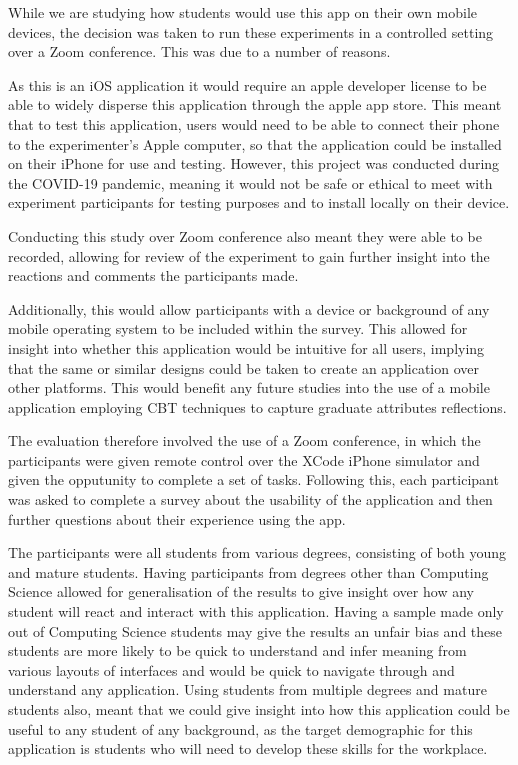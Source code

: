 \documentclass{l4proj}
\begin{document}
While we are studying how students would use this app on their own mobile devices, the decision
was taken to run these experiments in a controlled setting over a Zoom conference. This was due to a
number of reasons. 
\par 
As this is an iOS application it would require an apple developer license to 
be able to widely disperse this application through the apple app store. This meant that to test
this application, users would need to be able to connect their phone to the experimenter's Apple computer, 
so that the application could be installed on their iPhone for use and testing. However, this project was conducted
during the COVID-19 pandemic, meaning it would not be safe or ethical to meet with experiment participants
for testing purposes and to install locally on their device. 
\par 
Conducting this study over Zoom conference also meant they were able to be recorded, allowing for review 
of the experiment to gain further insight into the reactions and comments the participants made.
\par 
Additionally, this would allow participants with a device or background of any mobile operating system to 
be included within the survey. This allowed for insight into whether this application would be intuitive for all 
users, implying that the same or similar designs could be taken to create an application over other platforms. This
would benefit any future studies into the use of a mobile application employing CBT techniques to capture graduate attributes 
reflections. 
\par 
The evaluation therefore involved the use of a Zoom conference, in which the participants were given remote control over
the XCode iPhone simulator and given the opputunity to complete a set of tasks. Following this, each participant was
asked to complete a survey about the usability of the application and then further questions about their experience
using the app. 
\par 
The participants were all students from various degrees, consisting of both young and mature students. 
Having participants from degrees other than Computing Science allowed for generalisation of the results to give insight
over how any student will react and interact with this application. Having a sample made only out of Computing Science
students may give the results an unfair bias and these students are more likely to be quick to understand and infer meaning
from various layouts of interfaces and would be quick to navigate through and understand any application. Using students from 
multiple degrees and mature students also, meant that we could give insight into how this application could be useful to
any student of any background, as the target demographic for this application is students who will need to develop these
skills for the workplace.
\par 
\end{document}
